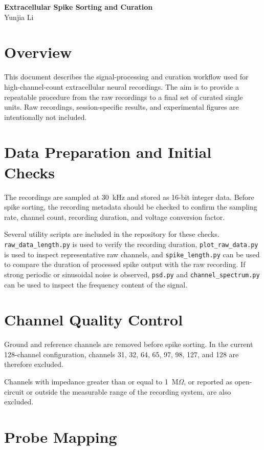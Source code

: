 \documentclass[11pt,a4paper]{article}
\begin{document}
\begin{center}
    {\LARGE \textbf{Extracellular Spike Sorting and Curation}}\\[0.5em]
    {Yunjia Li}
\end{center}

\section{Overview}

This document describes the signal-processing and curation workflow used for high-channel-count extracellular neural recordings. The aim is to provide a repeatable procedure from the raw recordings to a final
set of curated single units. Raw recordings, session-specific results, and experimental figures are intentionally not included.

\section{Data Preparation and Initial Checks}

The recordings are sampled at 30~kHz and stored as 16-bit integer data. Before spike sorting, the recording metadata should be checked to confirm the sampling rate, channel count, recording duration, and voltage conversion factor.

Several utility scripts are included in the repository for these checks.
\texttt{raw\_data\_length.py} is used to verify the recording duration,
\texttt{plot\_raw\_data.py} is used to inspect representative raw channels, and \texttt{spike\_length.py} can be used to compare the duration of processed spike output with the raw recording. If strong periodic or sinusoidal noise is observed, \texttt{psd.py} and \texttt{channel\_spectrum.py} can be used to inspect the frequency content of the signal.

\section{Channel Quality Control}

Ground and reference channels are removed before spike sorting. In the current 128-channel configuration, channels 31, 32, 64, 65, 97, 98, 127, and 128 are therefore excluded.

Channels with impedance greater than or equal to 1~M$\Omega$, or reported as open-circuit or outside the measurable range of the recording system, are also excluded.

\section{Probe Mapping}
\end{document}
